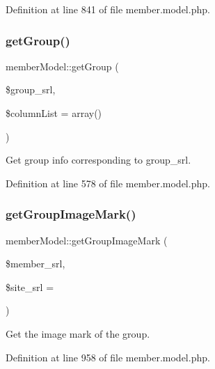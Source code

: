Definition at line 841 of file member.\+model.\+php.

\mbox{\label{classmemberModel_ae12bb2b9c0327902d3166905e3558720}} 
\subsubsection{\texorpdfstring{get\+Group()}{getGroup()}}
{\footnotesize\ttfamily member\+Model\+::get\+Group (\begin{DoxyParamCaption}\item[{}]{\$group\+\_\+srl,  }\item[{}]{\$column\+List = {\ttfamily array()} }\end{DoxyParamCaption})}



Get group info corresponding to group\+\_\+srl. 



Definition at line 578 of file member.\+model.\+php.

\mbox{\label{classmemberModel_a0a4de94189c084493992feb8d7da5dcb}} 
\subsubsection{\texorpdfstring{get\+Group\+Image\+Mark()}{getGroupImageMark()}}
{\footnotesize\ttfamily member\+Model\+::get\+Group\+Image\+Mark (\begin{DoxyParamCaption}\item[{}]{\$member\+\_\+srl,  }\item[{}]{\$site\+\_\+srl = {} }\end{DoxyParamCaption})}



Get the image mark of the group. 



Definition at line 958 of file member.\+model.\+php.

\mbox{\label{classmemberModel_a79bd0adae2d71115335afae1fc8f4e32}} 

